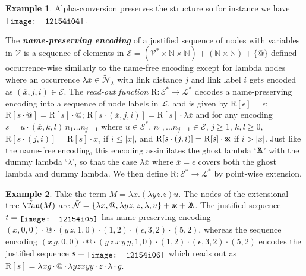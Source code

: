 \documentclass[xchauthor,chkrefs,GCNS,amsmath,amsthm,rotating,leaveRGB]{tcsg}
\renewcommand{\index}[1]{}
\theoremstyle{plain}
\theoremstyle{definition}
\newtheorem{example}{Example}[section]
\newcommand{\VarSet}{\mathcal{V}}
\newcommand{\Nodes}{\mathcal{N}}
\newcommand{\ExtendedNodes}{\tilde{\Nodes}}
\newcommand{\ExtendedNodesLmd}{\tilde{\Nodes}_{\lambda}}
\def\readout{\mathrm{R}}
\def\nameencoding{\mathcal{E}}
\newcommand{\ghostlmd}{{\lambda\mkern-7mu \lambda}}
\newcommand{\ghostvar}{\mathsf{x\mkern-5mu x}}
\newcommand{\exttree}{\tilde{\Tau}}
\begin{document}
\begin{example}
Alpha-conversion preserves the structure so for instance we have
$\raisebox{-1pt}{\texttt{[image: 12154i04]}}$.
\end{example}

The \textbf{\emph{name-preserving encoding}}\index{name-preserving encoding}
of a justified sequence of nodes with variables in $\VarSet $ is a sequence
of elements in $\nameencoding = (\mathcal{V}^{*}\times \mathbb {N}\times
\mathbb {N}) + (\mathbb {N}\times \mathbb {N}) + \{ @ \}$  defined
occurrence-wise similarly to the name-free encoding except for lambda nodes
where an occurrence $\lambda \overline{x}\in \ExtendedNodesLmd $ with link
distance $j$ and link label $i$ gets encoded as $(\overline{x},j,i) \in
\mathcal{E}$. The \emph{read-out function} $\readout : \nameencoding ^{*}
\rightarrow \mathcal{L}^{*}$ decodes a name-preserving encoding into a
sequence of node labels in $\mathcal{L}$, and is given by $\readout [\epsilon
]= \epsilon $; $\readout [s \cdot @] = \readout [s] \cdot @$; $\readout [s
\cdot (\overline{x}, j, i) ] = \readout [s] \cdot \lambda \overline{x}$ and
for any encoding $s = u \cdot (\overline{x}, k, l)\,  n_{1} \ldots n_{j-1}$
where $u \in \nameencoding ^{*}$, $n_{1}, \ldots n_{j-1}\in \nameencoding $,
$j\geq 1$, $k,l\geq 0$, $\readout [s\cdot (j,i)] = \readout [s] \cdot x_{i}$
if $i\leq |\overline{x}|$, and $\readout [s\cdot (j,i)]  = \readout [s] \cdot
\ghostvar $ if $i> |\overline{x}|$. Just like the name-free encoding, this
encoding assimilates the ghost lambda `$\ghostlmd $' with the dummy lambda
`$\lambda $', so that the case $\lambda \overline{x}$ where
$\overline{x}=\epsilon $ covers both the ghost lambda and dummy lambda. We
then define $\readout \colon \nameencoding ^{*} \rightarrow \mathcal{L}^{*}$
by point-wise extension.

\begin{example}\label{examp:ghost_materialization}
Take the term $M = \lambda x. (\lambda y z.z) u$. The nodes of the
extensional tree $\exttree (M)$ are $\ExtendedNodes = \{ \lambda x, @,
\lambda y z, z, \lambda , u \} + \ghostvar + \ghostlmd $. The justified
sequence $t = \raisebox{-2pt}{\texttt{[image: 12154i05]}} $ has name-preserving encoding $(x
,0,0)\cdot @\cdot (y\, z, 1,0)\cdot (1,2)\cdot (\epsilon ,3,2)\cdot (5,2)$,
whereas the sequence encoding $ (x\, g, 0, 0)\cdot @\cdot (y\, z\, x\, y\, y,
1,0)\cdot (1,2)\cdot (\epsilon ,3,2) \cdot (5,2)$ encodes the justified
sequence $s= \raisebox{-2pt}{\texttt{[image: 12154i06]}} $ which reads out as $\readout [s]=
\lambda x g \cdot @ \cdot \lambda y z x y y \cdot z \cdot \lambda \cdot g$.
\end{example}
\end{document}
